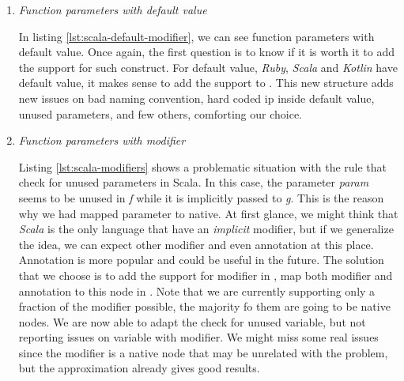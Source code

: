 \begin{enumerate}
	\item \textit{Function parameters with default value} \newline 
	
	
	In listing \ref{lst:scala-default-modifier}, we can see function parameters with default value. Once again, the first question is to know if it is worth it to add the support for such construct. 
	For default value, \emph{Ruby}, \emph{Scala} and \emph{Kotlin} have default value, it makes sense to add the support to \slang{}. 
	This new structure adds new issues on bad naming convention, hard coded ip inside default value, unused parameters, and few others, comforting our choice.

	\item \textit{Function parameters with modifier} \newline 
	 
	
	
	Listing \ref{lst:scala-modifiers} shows a problematic situation with the rule that check for unused parameters in Scala. In this case, the parameter \emph{param} seems to be unused in \emph{f} while it is implicitly passed to \emph{g}.
	This is the reason why we had mapped parameter to native.
	At first glance, we might think that \emph{Scala} is the only language that have an \emph{implicit} modifier, but if we generalize the idea, we can expect other modifier and even annotation at this place. 
	Annotation is more popular and could be useful in the future.
	The solution that we choose is to add the support for modifier in \slang{}, map both modifier and annotation to this node in \slang{}.
	Note that we are currently supporting only a fraction of the modifier possible, the majority fo them are going to be native nodes.
	We are now able to adapt the check for unused variable, but not reporting issues on variable with modifier. 
	We might miss some real issues since the modifier is a native node that may be unrelated with the problem, but the approximation already gives good results.
	
	

\end{enumerate}

